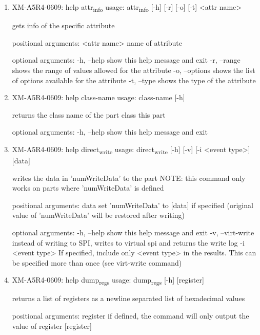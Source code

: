 \documentclass[11pt]{article}
\begin{document}
\begin{enumerate}
\item XM-A5R4-0609: help attr\textsubscript{info}
\label{sec:org7876f39}
usage: attr\textsubscript{info} [-h] [-r] [-o] [-t] <attr name>

gets info of the specific attribute

positional arguments:
  <attr name>    name of attribute

optional arguments:
  -h, --help     show this help message and exit
  -r, --range    shows the range of values allowed for the attribute
  -o, --options  shows the list of options available for the attribute
  -t, --type     shows the type of the attribute

\item XM-A5R4-0609: help class-name
\label{sec:org322a954}
usage: class-name [-h]

returns the class name of the part class this part

optional arguments:
  -h, --help  show this help message and exit

\item XM-A5R4-0609: help direct\textsubscript{write}
\label{sec:org4257726}
usage: direct\textsubscript{write} [-h] [-v] [-i <event type>] [data]

writes the data in 'numWriteData' to the part NOTE: this command only works on
parts where 'numWriteData' is defined

positional arguments:
  data              set 'numWriteData' to [data] if specified (original value
                    of 'numWriteData' will be restored after writing)

optional arguments:
  -h, --help        show this help message and exit
  -v, --virt-write  instead of writing to SPI, writes to virtual spi and
                    returns the write log
  -i <event type>   If specified, include only <event type> in the results.
                    This can be specified more than once (see virt-write
                    command)

\item XM-A5R4-0609: help dump\textsubscript{regs}
\label{sec:orgad5eff3}
usage: dump\textsubscript{regs} [-h] [register]

returns a list of registers as a newline separated list of hexadecimal values

positional arguments:
  register    if defined, the command will only output the value of register
              [register]


\end{enumerate}
\end{document}
